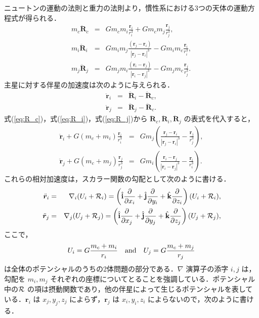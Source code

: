 \documentclass[11pt,a4paper,oneside,onecolumn]{jreport}
\begin{document}
ニュートンの運動の法則と重力の法則より，慣性系における3つの天体の運動方程式が得られる．
\begin{eqnarray}
m_c \ddot{\bm R}_c & = & G m_c m_i \frac{{\bm r}_i}{r_i^3} + G m_c m_j \frac{{\bm r}_j}{r_j^3}, \label{eq:R_c}\\
m_i \ddot{\bm R}_i & = & G m_i m_j \frac{({\bm r}_j - {\bm r}_i)}{|{\bm r}_j - {\bm r}_i|^3} - G m_i m_c \frac{{\bm r}_i}{r_i^3}, \label{eq:R_i}\\
m_j \ddot{\bm R}_j & = & G m_j m_i \frac{({\bm r}_i - {\bm r}_j)}{|{\bm r}_i - {\bm r}_j|^3} - G m_j m_c \frac{{\bm r}_j}{r_j^3}. \label{eq:R_j}
\end{eqnarray}
主星に対する伴星の加速度は次のように与えられる．
\begin{eqnarray}
\ddot{\bm r}_i & = & \ddot{\bm R}_i - \ddot{\bm R}_c, \\
\ddot{\bm r}_j & = & \ddot{\bm R}_j - \ddot{\bm R}_c.
\end{eqnarray}
式(\ref{eq:R_c})，式(\ref{eq:R_i})，式(\ref{eq:R_j})から $\ddot{\bm R}_c, \ddot{\bm R}_i, \ddot{\bm R}_j$ の表式を代入すると，
\begin{eqnarray}
\ddot{\bm r}_i + G (m_c + m_i) \frac{{\bm r}_i}{r_i^3} & = & G m_j \left( \frac{{\bm r}_j - {\bm r}_i}{| {\bm r}_j - {\bm r}_i |^3} - \frac{{\bm r}_j}{r_j^3} \right), \label{eq:r_i} \\ 
\ddot{\bm r}_j + G (m_c + m_j) \frac{{\bm r}_j}{r_j^3} & = & G m_i \left( \frac{{\bm r}_i - {\bm r}_j}{| {\bm r}_i - {\bm r}_j |^3} - \frac{{\bm r}_i}{r_i^3} \right). \label{eq:r_j}
\end{eqnarray}
これらの相対加速度は，スカラー関数の勾配として次のように書ける．
\begin{eqnarray}
\ddot{\bm r}_i & = & \nabla_i (U_i + {\cal R}_i) = \left( \hat{\bf i} \frac{\partial}{\partial x_i} + \hat{{\bf j}} \frac{\partial}{\partial y_i} + \hat{\bf k} \frac{\partial}{\partial z_i} \right) (U_i + {\cal R}_i), \label{eq:r_i_nabla} \\ 
\ddot{\bm r}_j & = & \nabla_j (U_j + {\cal R}_j) = \left( \hat{\bf i} \frac{\partial}{\partial x_j} + \hat{{\bf j}} \frac{\partial}{\partial y_j} + \hat{\bf k} \frac{\partial}{\partial z_j} \right) (U_j + {\cal R}_j), \label{eq:r_j_nabla}
\end{eqnarray}
ここで，
\begin{equation}
U_i = G \frac{m_c + m_i}{r_i} \quad {\rm and} \quad U_j = G \frac{m_c + m_j}{r_j}
\end{equation}
は全体のポテンシャルのうちの2体問題の部分である．$\nabla$ 演算子の添字 $i, j$ は，勾配を $m_i, m_j$ それぞれの座標についてとることを強調している．ポテンシャル中の${\cal R}$ の項は摂動関数であり，他の伴星によって生じるポテンシャルを表している．${\bm r}_i$ は $x_j, y_j, z_j$ によらず，${\bm r}_j$ は $x_i, y_i, z_i$ によらないので，次のように書ける．
\end{document}
